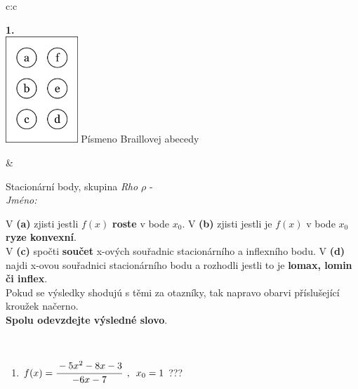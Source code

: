 \documentclass[10pt]{report}
\begin{document}
\begin{tabular}{c:c}
\begin{minipage}[c][104.5mm][t]{0.5\linewidth}
\begin{center}
\begin{minipage}{0.79\linewidth}
\end{minipage}
\begin{minipage}{0.20\linewidth}
\begin{center}
{\Huge\bfseries 1.} \\[2mm]
\includegraphics[height=40mm]{../images/braille.png}
{\small Písmeno Braillovej abecedy}
\end{center}
\end{minipage}
\end{center}
\end{minipage}
&
\begin{minipage}[c][104.5mm][t]{0.5\linewidth}
\begin{center}
\vspace{7mm}
{\huge Stacionární body, skupina \textit{Rho $\rho$} -}\\[5mm]
\textit{Jméno:}\phantom{xxxxxxxxxxxxxxxxxxxxxxxxxxxxxxxxxxxxxxxxxxxxxxxxxxxxxxxxxxxxxxxxx}\\[5mm]
\begin{minipage}{0.95\linewidth}
\begin{center}
{\small V \textbf{(a)} zjisti jestli $f(x)$ \textbf{roste} v bode $x_0$. V \textbf{(b)} zjisti jestli je $f(x)$ v bode $x_0$ \textbf{ryze konvexní}.\\V \textbf{(c)} spočti \textbf{součet} x-ových souřadnic stacionárního a inflexního bodu. V \textbf{(d)} najdi x-ovou souřadnici stacionárního bodu a rozhodli jestli to je \textbf{lomax, lomin či inflex}.\\Pokud se výsledky shodujú s těmi za otazníky, tak napravo obarvi příslušející kroužek načerno.\\\textbf{Spolu odevzdejte výsledné slovo}}.
\end{center}
\end{minipage}
\\[1mm]
\begin{minipage}{0.79\linewidth}
\begin{center}
\begin{varwidth}{\linewidth}
\begin{enumerate}
\normalsize
\item $f(x)=\cfrac{-5x^2-8x-3}{-6x-7}\enspace , \enspace x_0=1$\quad \dotfill\; ???\;\dotfill \quad {}

\end{enumerate}
\end{varwidth}
\end{center}
\end{minipage}
\end{center}
\end{minipage}
\end{tabular}
\end{document}

